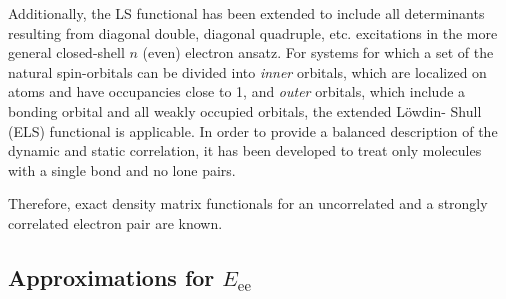 \begin{enumerate}
        Additionally, the LS functional has been extended to include all 
        determinants resulting from diagonal double, diagonal quadruple, etc. 
        excitations in the more general closed-shell $n$ (even) electron ansatz.
        For systems for which a set of the natural spin-orbitals can be divided 
        into \textit{inner} orbitals, which are localized on atoms and have 
        occupancies close to 1, and \textit{outer} orbitals, which include a 
        bonding orbital and all weakly occupied orbitals, the extended Löwdin-
        Shull (ELS) functional is 
        applicable.
        In order to provide a balanced description of the dynamic and static 
        correlation, it has been developed to treat only molecules with a 
        single bond and no lone pairs.

\end{enumerate}

Therefore, exact density matrix functionals for an uncorrelated and a strongly
correlated electron pair are known.

\subsection{Approximations for $E_{\text{ee}}$} %
\label{sec:approximated-Eee}

